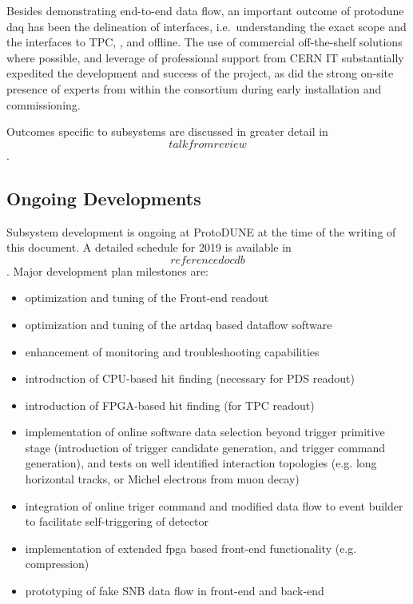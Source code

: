 Besides demonstrating end-to-end data flow, an important outcome of
protodune daq has been the delineation of
interfaces, i.e.~understanding the exact  scope and the interfaces to TPC, , and offline. The use of commercial off-the-shelf solutions
where possible, and leverage of professional support from CERN IT 
substantially expedited the development and success of the project, as
did the strong on-site presence of experts from within the consortium during early installation and
commissioning. 

Outcomes specific to  subsystems are discussed in
greater detail in \[talk from review\].

\subsection{Ongoing Developments}
\label{sec:sp-daq:design-validation}


Subsystem development is ongoing at ProtoDUNE at the time of the
writing of this document. A detailed schedule for 2019 is available
in \[referencedocdb\]. Major development plan milestones are:
\begin{itemize}
\item optimization and tuning of the Front-end readout
\item optimization and tuning of the artdaq based dataflow software
\item enhancement of monitoring and troubleshooting capabilities
\item introduction of CPU-based hit finding (necessary for PDS readout)
\item introduction of FPGA-based hit finding (for TPC readout)
\item implementation of online software data selection beyond trigger
primitive stage (introduction of trigger candidate generation, and
trigger command generation), and tests on well identified interaction
topologies (e.g. long horizontal tracks, or Michel electrons from muon decay)
\item integration of online triger command and modified data flow to event
builder to facilitate self-triggering of detector
\item implementation of extended fpga based front-end functionality
(e.g. compression)
\item prototyping of fake SNB data flow in front-end and back-end
\end{itemize}


